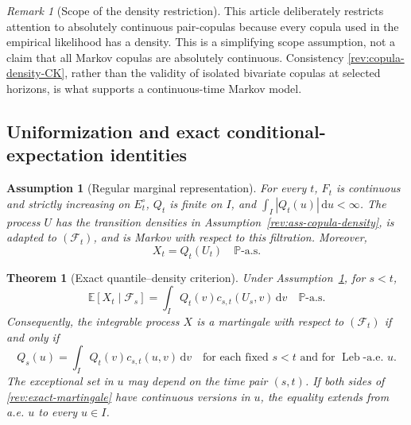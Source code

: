 \documentclass[11pt]{article}
\newtheorem{assumption}[definition]{Assumption}
\newtheorem{theorem}[definition]{Theorem}
\theoremstyle{remark}
\newtheorem{remark}[definition]{Remark}
\newcommand{\E}{\mathbb E}
\newcommand{\Pp}{\mathbb P}
\newcommand{\dd}{\,\mathrm d}
\newcommand{\Leb}{\operatorname{Leb}}
\begin{document}
\begin{remark}[Scope of the density restriction]
This article deliberately restricts attention to absolutely continuous
pair-copulas because every copula used in the empirical likelihood has a
density.  This is a simplifying scope assumption, not a claim that all Markov
copulas are absolutely continuous.  Consistency
\eqref{rev:copula-density-CK}, rather than the validity of isolated bivariate
copulas at selected horizons, is what supports a continuous-time Markov model.
\end{remark}

\subsection{Uniformization and exact conditional-expectation identities}

\begin{assumption}[Regular marginal representation]
\label{rev:ass-marginal}
For every $t$, $F_t$ is continuous and strictly increasing on $E_t^\circ$,
$Q_t$ is finite on $I$, and $\int_I|Q_t(u)|\dd u<\infty$.  The process $U$ has
the transition densities in Assumption~\ref{rev:ass-copula-density}, is
adapted to $(\mathcal F_t)$, and is Markov with respect to this filtration.
Moreover,
\begin{equation}
X_t=Q_t(U_t)\quad\Pp\text{-a.s.}
\label{rev:uniformization}
\end{equation}
\end{assumption}

\begin{theorem}[Exact quantile--density criterion]
\label{rev:thm-exact-density}
Under Assumption~\ref{rev:ass-marginal}, for $s<t$,
\begin{equation}
\E[X_t\mid\mathcal F_s]
=\int_IQ_t(v)c_{s,t}(U_s,v)\dd v
\quad\Pp\text{-a.s.}
\label{rev:conditional-quantile}
\end{equation}
Consequently, the integrable process $X$ is a martingale with respect to
$(\mathcal F_t)$ if and only if
\begin{equation}
Q_s(u)=\int_IQ_t(v)c_{s,t}(u,v)\dd v
\quad\text{for each fixed }s<t\text{ and for }\Leb\text{-a.e. }u.
\label{rev:exact-martingale}
\end{equation}
The exceptional set in $u$ may depend on the time pair $(s,t)$.  If both sides
of \eqref{rev:exact-martingale} have continuous versions in $u$, the equality
extends from a.e. $u$ to every $u\in I$.
\end{theorem}
\end{document}
